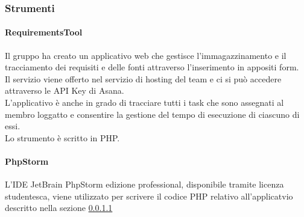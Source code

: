 		\subsubsection{Strumenti}
		
			\paragraph{RequirementsTool}
			\label{par:requirements_tool}
			Il gruppo ha creato un applicativo web che gestisce l'immagazzinamento e il tracciamento dei requisiti e delle fonti attraverso l'inserimento in appositi form\gloss{}. \\
			Il servizio viene offerto nel servizio di hosting del team e ci si può accedere attraverso le API\gloss{} Key di Asana\gloss{}. \\
			L'applicativo è anche in grado di tracciare tutti i task\gloss{} che sono assegnati al membro loggatto e consentire la gestione del tempo di esecuzione di ciascuno di essi. \\
			Lo strumento è scritto in PHP.
			
			\paragraph{PhpStorm} %
			\label{par:php_storm}
			L'IDE JetBrain PhpStorm edizione professional, disponibile tramite licenza studentesca, viene utilizzato per scrivere il codice PHP relativo all'applicatvio descritto nella sezione \ref{par:requirements_tool}
			 